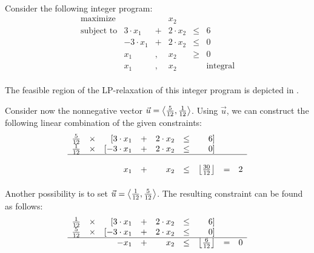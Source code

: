 \paragraph{}
\begin{example}
Consider the following integer program:
\begin{equation}
\begin{array}{rrcrcr}
\mbox{maximize}&&&x_2\\
\mbox{subject to}&3\cdot x_1&+&2\cdot x_2&\leq&6\\
&-3\cdot x_1&+&2\cdot x_2&\leq&0\\
&x_1&,&x_2&\geq&0\\
&x_1&,&x_2&&\mbox{integral}
\end{array}
\end{equation}

\paragraph{}
The feasible region of the LP-relaxation of this integer program is depicted in .



Consider now the nonnegative vector $\vec{u}=\left\langle \frac{5}{12},\frac{1}{12} \right\rangle$. Using $\vec{u}$, we can construct the following linear combination of the given constraints:
\begin{equation}
\begin{array}{rcrcrcrcr}
\tfrac{5}{12}&\times&[3\cdot x_1&+&2\cdot x_2&\leq&6]&&\\
\tfrac{1}{12}&\times&[-3\cdot x_1&+&2\cdot x_2&\leq&0]&&\\\hline\\
&&x_1&+&x_2&\leq&\left\lfloor \frac{30}{12} \right\rfloor&=&2
\end{array}
\end{equation}

\paragraph{}
Another possibility is to set $\vec{u}=\left\langle \frac{1}{12},\frac{5}{12} \right\rangle$. The resulting constraint can be found as follows:
\begin{equation}
\begin{array}{rcrcrcrcr}
\tfrac{1}{12}&\times&[3\cdot x_1&+&2\cdot x_2&\leq&6]&&\\
\tfrac{5}{12}&\times&[-3\cdot x_1&+&2\cdot x_2&\leq&0]&&\\\hline
&&-x_1&+&x_2&\leq&\left\lfloor \tfrac{6}{12} \right\rfloor&=&0
\end{array}
\end{equation}


\end{example}
